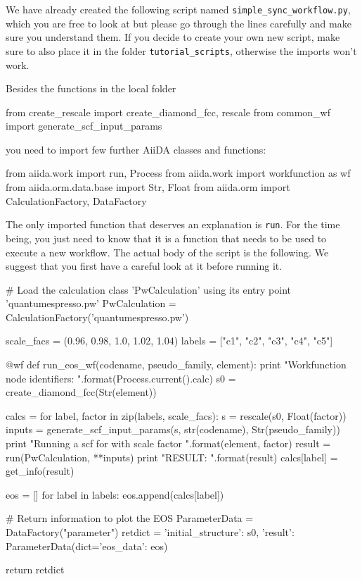 \begin{tcolorbox}
We have already created the following script named \texttt{simple\_sync\_workflow.py}, which you are free to look at but please go through the lines carefully and make sure you understand them.
If you decide to create your own new script, make sure to also place it in the folder \texttt{tutorial\_scripts}, otherwise the imports won't work.
\end{tcolorbox}
Besides the functions in the local folder
\begin{pythoncommand}
from create_rescale import create_diamond_fcc, rescale
from common_wf import generate_scf_input_params
\end{pythoncommand}
you need to import few further AiiDA classes and functions:
\begin{pythoncommand}
from aiida.work import run, Process
from aiida.work import workfunction as wf
from aiida.orm.data.base import Str, Float
from aiida.orm import CalculationFactory, DataFactory
\end{pythoncommand}

The only imported function that deserves an explanation is \texttt{run}.
For the time being, you just need to know that it is a function that needs to be used to execute a new workflow.
The actual body of the script is the following.
We suggest that you first have a careful look at it before running it.

\begin{pythoncommand}
# Load the calculation class 'PwCalculation' using its entry point 'quantumespresso.pw'
PwCalculation = CalculationFactory('quantumespresso.pw')

scale_facs = (0.96, 0.98, 1.0, 1.02, 1.04)
labels = ["c1", "c2", "c3", "c4", "c5"]

@wf
def run_eos_wf(codename, pseudo_family, element):
    print "Workfunction node identifiers: {}".format(Process.current().calc)
    s0 = create_diamond_fcc(Str(element))

    calcs = {}
    for label, factor in zip(labels, scale_facs):
        s = rescale(s0, Float(factor))
        inputs = generate_scf_input_params(s, str(codename), Str(pseudo_family))
        print "Running a scf for {} with scale factor {}".format(element, factor)
        result = run(PwCalculation, **inputs)
        print "RESULT: {}".format(result)
        calcs[label] = get_info(result)

    eos = []
    for label in labels:
        eos.append(calcs[label])

    # Return information to plot the EOS
    ParameterData = DataFactory("parameter")
    retdict = {
            'initial_structure': s0,
            'result': ParameterData(dict={'eos_data': eos})
        }

    return retdict
\end{pythoncommand}

